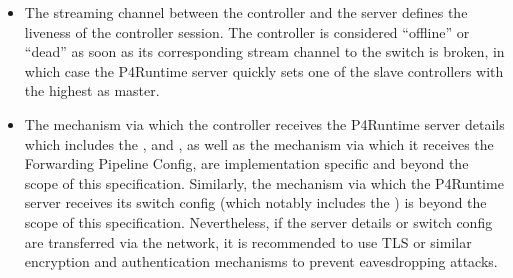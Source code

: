 \documentclass[11pt]{article}
\begin{document}
{\begin{itemize}
\item{}
The streaming channel between the controller and the server defines the
liveness of the controller session. The controller is considered \textquotedblleft{}offline\textquotedblright{} or
\textquotedblleft{}dead\textquotedblright{} as soon as its corresponding stream channel to the switch is
broken, in which case the P4Runtime server quickly sets one of the slave
controllers with the highest  as master.%

\item{}
The mechanism via which the controller receives the P4Runtime server details
which includes the ,  and , as well as the mechanism via
which it receives the Forwarding Pipeline Config, are implementation specific
and beyond the scope of this specification. Similarly, the mechanism via which
the P4Runtime server receives its switch config (which notably includes the
) is beyond the scope of this specification.  Nevertheless, if the
server details or switch config are transferred via the network, it is
recommended to use TLS or similar encryption and authentication mechanisms to
prevent eavesdropping attacks.%


\end{itemize}}
\end{document}

